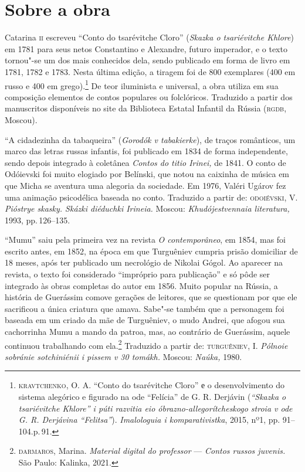 \section{Sobre a obra}

\noindent{}Catarina \textsc{ii} escreveu ``Conto do tsarévitche Cloro'' (\emph{Skazka o tsariévitche Khlore}) em 1781 para seus
netos Constantino e Alexandre, futuro imperador, e o texto tornou"-se um
dos mais conhecidos dela, sendo publicado em forma de livro em 1781,
1782 e 1783. Nesta última edição, a tiragem foi de 800 exemplares (400
em russo e 400 em grego).\footnote{\scriptsize\textsc{kravtchenko}, O. A. “Conto do tsarévitche Cloro” е o desenvolvimento do sistema alegórico e figurado na ode “Felícia” de G. R. Derjávin (\textit{“Skazka o tsariévitche Khlore” i púti razvitia eio óbrazno-allegorítcheskogo stroia v ode G. R. Derjávina “Felitsa”}). \textit{Imalologuia i komparativistka}, 2015, nº1, pp. 91–104.p.\,91.} De teor iluminista e
universal, a obra utiliza em sua composição elementos de contos
populares ou folclóricos. Traduzido a partir dos
manuscritos disponíveis no site da Biblioteca Estatal Infantil da Rússia
(\textsc{rgdb}, Moscou).

\medskip

``A cidadezinha da tabaqueira'' (\emph{Gorodók v tabakierke}), de traços
românticos, um marco das letras russas infantis, foi publicado em 1834
de forma independente, sendo depois integrado à coletânea \emph{Contos
do titio Irinei,} de 1841. O conto de Odóievski foi muito elogiado por
Belínski, que notou na caixinha de música em que Micha se
aventura uma alegoria da sociedade. Em 1976, Valéri Ugárov fez uma
animação psicodélica baseada no conto. Traduzido a partir de:
\textsc{odoiévski}, V. \emph{Pióstrye skasky. Skázki diéduchki Irineia.} Moscou:
\emph{Khudójestvennaia literatura,} 1993, pp.\,126--135.

\medskip

``Mumu'' saiu pela primeira vez na revista \emph{O contemporâneo}, em
1854, mas foi escrito antes, em 1852, na época em que Turguêniev cumpria
prisão domiciliar de 18 meses, após ter publicado um necrológio de
Nikolai Gógol. Ao aparecer na revista, o texto foi considerado
``impróprio para publicação'' e só pôde ser integrado às obras completas
do autor em 1856. Muito popular na Rússia, a história de Guerássim
comove gerações de leitores, que se questionam por que ele sacrificou a
única criatura que amava. Sabe"-se também que a personagem foi baseada em
um criado da mãe de Turguêniev, o mudo Andrei, que afogou sua
cachorrinha Mumu a mando da patroa, mas, ao contrário de Guerássim, aquele
continuou trabalhando com ela.\footnote{\scriptsize\textsc{darmaros}, Marina. \emph{Material digital
  do professor} --- \emph{Contos russos juvenis.} São Paulo: Kalinka, 2021.}
Traduzido a partir de:
\textsc{turguêniev}, I. \emph{Pólnoie sobránie sotchiniénii i pissem v 30
tomákh.} Moscou: \emph{Naúka,} 1980.

